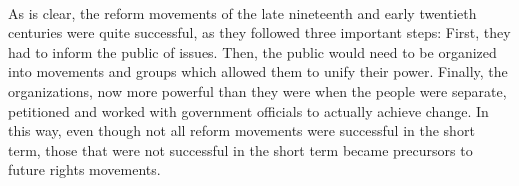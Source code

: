 \documentclass[12pt]{article}
\begin{document}
\paragraph{} As is clear, the reform movements of the late nineteenth and early twentieth centuries were quite successful, as they followed three important steps: First, they had to inform the public of issues. Then, the public would need to be organized into movements and groups which allowed them to unify their power. Finally, the organizations, now more powerful than they were when the people were separate, petitioned and worked with government officials to actually achieve change. In this way, even though not all reform movements were successful in the short term, those that were not successful in the short term became precursors to future rights movements.
\end{document}
